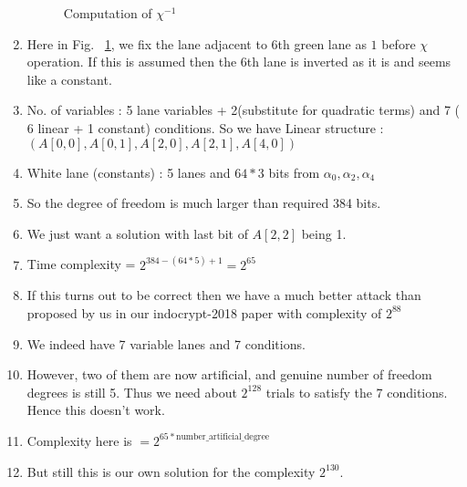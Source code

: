 \documentclass{article}
\begin{document}
\begin{enumerate}
\begin{figure}[ht]
\begin{center}
\end{center}
\caption{Computation of $\chi^{-1}$\label{chi_inv2}}
\end{figure}
    \item Here in Fig. ~\ref{chi_inv2}, we fix the lane adjacent to 6th green lane as $1$ before $\chi$ operation. If this is assumed then the 6th lane is inverted as it is and seems like a constant.
    \item No. of variables : 5 lane variables + 2(substitute for quadratic terms) and 7 ( 6 linear + 1 constant) conditions. So we have Linear structure : $(A[0,0], A[0,1], A[2, 0], A[2,1], A[4,0])$
    \item White lane (constants) : 5 lanes and $64*3$ bits from $\alpha_0, \alpha_2, \alpha_4$
    \item So the degree of freedom is much larger than required 384 bits.
    \item We just want a solution with last bit of $A[2,2]$ being 1.
    \item Time complexity = $2^{384 - (64*5) + 1} = 2^{65}$
    \item If this turns out to be correct then we have a much better attack than proposed by us in our indocrypt-2018 paper with complexity of $2^{88}$
    \item We indeed have 7 variable lanes and 7 conditions.
    \item However, two of them are now artificial, and genuine number of freedom degrees is still 5. Thus we need about $2^128$ trials to satisfy the 7 conditions. Hence this doesn't work.
    \item Complexity here is $= 2^{65*\text{number\_artificial\_degree}} $
    \item But still this is our own solution for the complexity $2^{130}$.
\end{enumerate}
\end{document}
